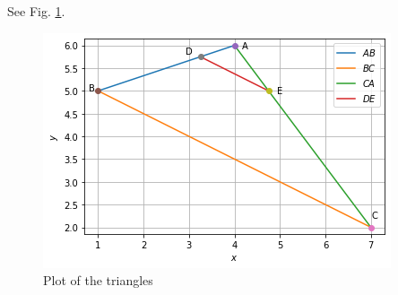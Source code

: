 See Fig. \ref{aug/2/1plot}.
\begin{figure}[!h]
 \centering
 \includegraphics[width=\columnwidth]{solutions/aug/2/1/figs/figs.png}
 \caption{Plot of the triangles}
 \label{aug/2/1plot}
\end{figure}



